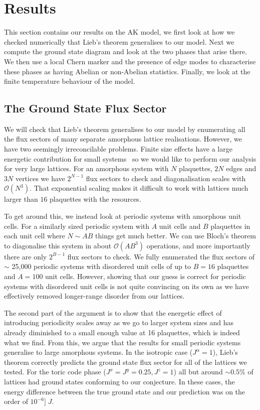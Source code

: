 \hypertarget{amk-results}{%
\section{Results}\label{amk-results}}

This section contains our results on the AK model, we first look at how we checked numerically that Lieb's theorem generalises to our model. Next we compute the ground state diagram and look at the two phases that arise there. We then use a local Chern marker and the presence of edge modes to characterise these phases as having Abelian or non-Abelian statistics. Finally, we look at the finite temperature behaviour of the model.

\hypertarget{the-ground-state-flux-sector}{%
\subsection{The Ground State Flux Sector}\label{the-ground-state-flux-sector}}

We will check that Lieb's theorem generalises to our model by enumerating all the flux sectors of many separate amorphous lattice realisations. However, we have two seemingly irreconcilable problems. Finite size effects have a large energetic contribution for small systems~\autocite{kitaevAnyonsExactlySolved2006} so we would like to perform our analysis for very large lattices. For an amorphous system with \(N\) plaquettes, \(2N\) edges and \(3N\) vertices we have \(2^{N-1}\) flux sectors to check and diagonalisation scales with \(\mathcal{O}(N^3)\). That exponential scaling makes it difficult to work with lattices much larger than \(16\) plaquettes with the resources.

To get around this, we instead look at periodic systems with amorphous unit cells. For a similarly sized periodic system with \(A\) unit cells and \(B\) plaquettes in each unit cell where \(N \sim AB\) things get much better. We can use Bloch's theorem to diagonalise this system in about \(\mathcal{O}(A B^3)\) operations, and more importantly there are only \(2^{B-1}\) flux sectors to check. We fully enumerated the flux sectors of \(\sim\) 25,000 periodic systems with disordered unit cells of up to \(B = 16\) plaquettes and \(A = 100\) unit cells. However, showing that our guess is correct for periodic systems with disordered unit cells is not quite convincing on its own as we have effectively removed longer-range disorder from our lattices.

The second part of the argument is to show that the energetic effect of introducing periodicity scales away as we go to larger system sizes and has already diminished to a small enough value at 16 plaquettes, which is indeed what we find. From this, we argue that the results for small periodic systems generalise to large amorphous systems. In the isotropic case (\(J^\alpha = 1\)), Lieb's theorem correctly predicts the ground state flux sector for all of the lattices we tested. For the toric code phase (\(J^x = J^y = 0.25, J^z = 1\)) all but around \(\sim 0.5 \%\) of lattices had ground states conforming to our conjecture. In these cases, the energy difference between the true ground state and our prediction was on the order of \(10^{-6}]\;J\).

